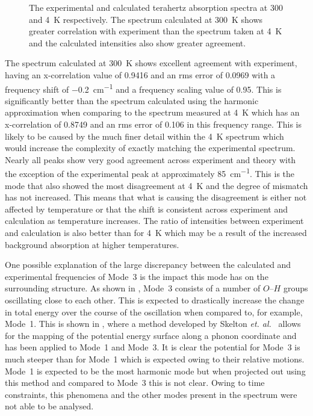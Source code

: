 \begin{figure}
\captionsetup{font = footnotesize, justification = centering}
\caption[The Calculated Terahertz Absorption Spectra at 300 and \SI{4}{K}]{The experimental and calculated terahertz absorption spectra at 300 and \SI{4}{K} respectively. The spectrum calculated at \SI{300}{K} shows greater correlation with experiment than the spectrum taken at \SI{4}{K} and the calculated intensities also show greater agreement.}
\label{Fig:RTvsEXP}
\end{figure}

The spectrum calculated at \SI{300}{K} shows excellent agreement with experiment, having an x-correlation value of 0.9416 and an \acrshort{rms} error of 0.0969 with a frequency shift of \SI{-0.2}{cm^{-1}} and a frequency scaling value of 0.95. This is significantly better than the spectrum calculated using the harmonic approximation when comparing to the spectrum measured at \SI{4}{K} which has an x\nobreakdash-correlation of 0.8749 and an \acrshort{rms} error of 0.106 in this frequency range. This is likely to be caused by the much finer detail within the \SI{4}{K} spectrum which would increase the complexity of exactly matching the experimental spectrum. Nearly all peaks show very good agreement across experiment and theory with the exception of the experimental peak at approximately \SI{85}{cm^{-1}}. This is the mode that also showed the most disagreement at \SI{4}{K} and the degree of mismatch has not increased. This means that what is causing the disagreement is either not affected by temperature or that the shift is consistent across experiment and calculation as temperature increases. The ratio of intensities between experiment and calculation is also better than for \SI{4}{K} which may be a result of the increased background absorption at higher temperatures.

One possible explanation of the large discrepancy between the calculated and experimental frequencies of Mode~3 is the impact this mode has on the surrounding structure. As shown in , Mode~3 consists of a number of \(O\)\nobreakdash--\(H\) groups oscillating close to each other. This is expected to drastically increase the change in total energy over the course of the oscillation when compared to, for example, Mode~1. This is shown in , where a method developed by Skelton \textit{et. al.}~\cite{Skelton2016} allows for the mapping of the potential energy surface along a phonon coordinate and has been applied to Mode~1 and Mode~3. It is clear the potential for Mode~3 is much steeper than for Mode~1 which is expected owing to their relative motions. Mode~1 is expected to be the most harmonic mode but when projected out using this method and compared to Mode~3 this is not clear. Owing to time constraints, this phenomena and the other modes present in the spectrum were not able to be analysed.

